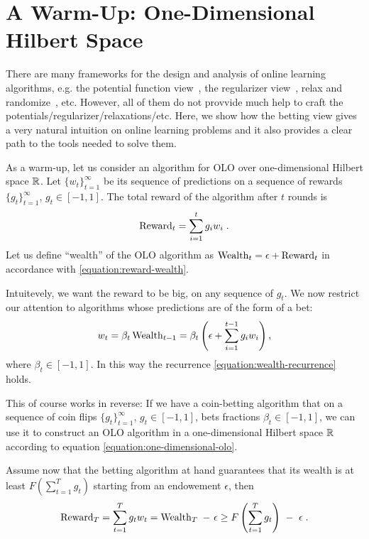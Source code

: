 \section{A Warm-Up: One-Dimensional Hilbert Space}
\label{section:one-dimensional-hilbert-space-olo}

There are many frameworks for the design and analysis of online learning algorithms, e.g. the potential function view~\cite{Cesa-BianchiL06}, the regularizer view~\cite{}, relax and randomize~\cite{}, etc. However, all of them do not provvide much help to craft the potentials/regularizer/relaxations/etc.
Here, we show how the betting view gives a very natural intuition on online learning problems and it also provides a clear path to the tools needed to solve them.

As a warm-up, let us consider an algorithm for OLO over one-dimensional Hilbert space $\mathbb{R}$.
Let $\{w_t\}_{t=1}^\infty$ be its sequence of predictions on a sequence of
rewards $\{g_t\}_{t=1}^\infty$, $g_t \in [-1,1]$. The total reward of the
algorithm after $t$ rounds is
\[
\operatorname{Reward}_t = \sum_{i=1}^t g_i w_i \; .
\]
Let us define ``wealth'' of the OLO algorithm as $\operatorname{Wealth}_t = \epsilon +
\operatorname{Reward}_t$ in accordance with \eqref{equation:reward-wealth}.

Intuitevely, we want the reward to be big, on any sequence of $g_t$. We now restrict our attention to algorithms whose predictions are of the form of a bet:
\begin{equation}
\label{equation:one-dimensional-olo}
w_t = \beta_t \operatorname{Wealth}_{t-1}
= \beta_t \left(\epsilon+ \sum_{i=1}^{t-1} g_i w_i \right),
\end{equation}
where $\beta_t \in [-1,1]$. In this way the recurrence \eqref{equation:wealth-recurrence} holds.

This of course works in reverse: If we have a coin-betting algorithm that on a
sequence of coin flips $\{g_t\}_{t=1}^\infty$, $g_t \in [-1,1]$, bets fractions
$\beta_t \in [-1,1]$, we can use it to construct an OLO algorithm in a
one-dimensional Hilbert space $\mathbb{R}$ according to equation
\eqref{equation:one-dimensional-olo}.

Assume now that the betting algorithm at hand guarantees that its wealth is at least $F(\sum_{t=1}^T g_t)$ starting from an endowement $\epsilon$, then 
\begin{equation}
\label{equation:one-dimensional-olo-reward-lower-bound}
\Reward_T
= \sum_{t=1}^T g_t w_t
= \Wealth_T \ - \ \epsilon \ge F\left(\sum_{t=1}^T g_t \right) \ - \ \epsilon \; .
\end{equation}

